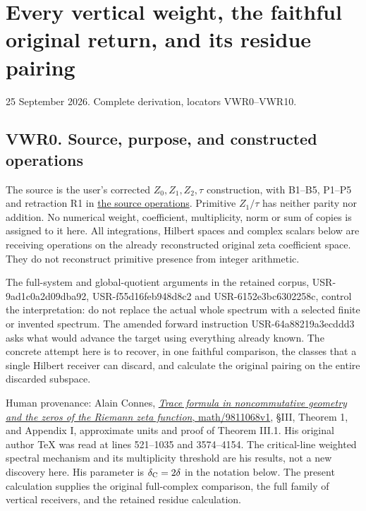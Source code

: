 \section{Every vertical weight, the faithful original return, and its
residue
pairing}\label{every-vertical-weight-the-faithful-original-return-and-its-residue-pairing}

25 September 2026. Complete derivation, locators VWR0--VWR10.

\subsection{VWR0. Source, purpose, and constructed
operations}\label{vwr0.-source-purpose-and-constructed-operations}

The source is the user's corrected \(Z_0,Z_1,Z_2,\tau\) construction,
with B1--B5, P1--P5 and retraction R1 in
\href{https://github.com/KokunoYumeto/zeta-function-research-reader/blob/36a82ecca98addb8a98b48204e349737856c7223/workbenches/splitzero-tandem/continuations/20260924-cohomology-weight-and-character-lifts/original-character-lifting/foundations/user_definitions_20260924/SOURCE_OPERATIONS_AND_PROOFS.md}{the
source operations}. Primitive \(Z_1/\tau\) has neither parity nor
addition. No numerical weight, coefficient, multiplicity, norm or sum of
copies is assigned to it here. All integrations, Hilbert spaces and
complex scalars below are receiving operations on the already
reconstructed original zeta coefficient space. They do not reconstruct
primitive presence from integer arithmetic.

The full-system and global-quotient arguments in the retained corpus,
USR-9ad1c0a2d09dba92, USR-f55d16feb948d8c2 and USR-6152e3bc6302258c,
control the interpretation: do not replace the actual whole spectrum
with a selected finite or invented spectrum. The amended forward
instruction USR-64a88219a3ecddd3 asks what would advance the target
using everything already known. The concrete attempt here is to recover,
in one faithful comparison, the classes that a single Hilbert receiver
can discard, and calculate the original pairing on the entire discarded
subspace.

Human provenance: Alain Connes,
\href{https://arxiv.org/abs/math/9811068v1}{\emph{Trace formula in
noncommutative geometry and the zeros of the Riemann zeta function},
math/9811068v1}, §III, Theorem 1, and Appendix I, approximate units and
proof of Theorem III.1. His original author TeX was read at lines
521--1035 and 3574--4154. The critical-line weighted spectral mechanism
and its multiplicity threshold are his results, not a new discovery
here. His parameter is \(\delta_{\rm C}=2\delta\) in the notation below.
The present calculation supplies the original full-complex comparison,
the full family of vertical receivers, and the retained residue
calculation.

